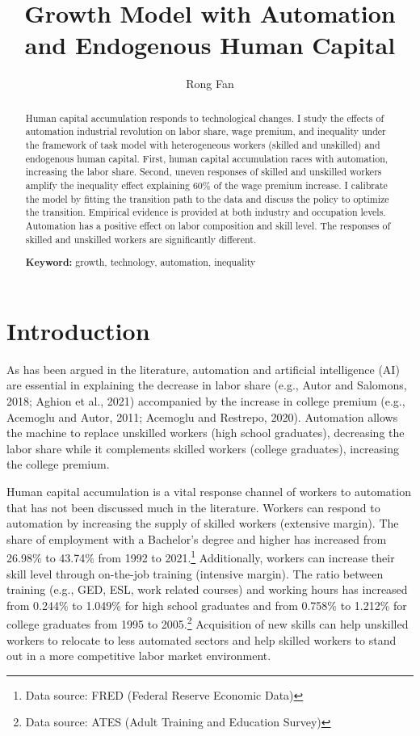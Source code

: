 \documentclass[12pt]{article}
\title{Growth Model with Automation and Endogenous Human Capital}
\date{}
\author{Rong Fan}
\begin{document}
\maketitle
\begin{abstract}
Human capital accumulation responds to technological changes. I study the effects of automation industrial revolution on labor share, wage premium, and inequality under the framework of task model with heterogeneous workers (skilled and unskilled) and endogenous human capital. First, human capital accumulation races with automation, increasing the labor share. Second, uneven responses of skilled and unskilled workers amplify the inequality effect explaining 60\% of the wage premium increase. I calibrate the model by fitting the transition path to the data and discuss the policy to optimize the transition. Empirical evidence is provided at both industry and occupation levels. Automation has a positive effect on labor composition and skill level. The responses of skilled and unskilled workers are significantly different.

{\bf Keyword: }growth, technology, automation, inequality
\end{abstract}

\clearpage
\section{Introduction}
As has been argued in the literature, automation and artificial intelligence (AI) are essential in explaining the decrease in labor share (e.g., Autor and Salomons, 2018\cite{AutorSalomons2018}; Aghion et al., 2021\nocite{Aghionetal2021}) accompanied by the increase in college premium (e.g., Acemoglu and Autor, 2011\nocite{AcemogluAutor2011}; Acemoglu and Restrepo, 2020\nocite{AcemogluRestrepo2020}). Automation allows the machine to replace unskilled workers (high school graduates), decreasing the labor share while it complements skilled workers (college graduates), increasing the college premium.

Human capital accumulation is a vital response channel of workers to automation that has not been discussed much in the literature. Workers can respond to automation by increasing the supply of skilled workers (extensive margin). The share of employment with a Bachelor's degree and higher has increased from 26.98\% to 43.74\% from 1992 to 2021.\footnote{Data source: FRED (Federal Reserve Economic Data)} Additionally, workers can increase their skill level through on-the-job training (intensive margin). The ratio between training (e.g., GED, ESL, work related courses) and working hours has increased from 0.244\% to 1.049\% for high school graduates and from 0.758\% to 1.212\% for college graduates from 1995 to 2005.\footnote{Data source: ATES (Adult Training and Education Survey)} Acquisition of new skills can help unskilled workers to relocate to less automated sectors and help skilled workers to stand out in a more competitive labor market environment. 
\end{document}
